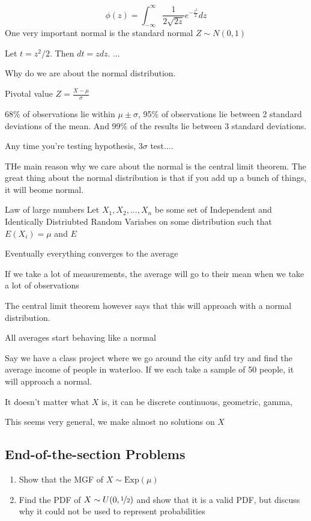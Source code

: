 \[
    \phi(z)=\int_{-\infty}^\infty \frac 1 {2\sqrt{2z}} e^{-\frac {z^2} 2}dz
\]
One very important normal is the standard normal $Z\sim N(0,1)$

Let $t=z^2/2$. Then $dt=zdz$. ...

Why do we are about the normal  distribution.

Pivotal value $Z=\frac{X-\mu}\sigma$

68\% of observations lie within $\mu\pm \sigma$, 95\% of observations lie between 2 standard deviations of the mean. And 99\% of the results lie between 3 standard deviations.

Any time you're testing hypothesis, $3\sigma$ test....


THe main reason why we care about the normal is the central limit theorem. The great thing about the normal distribution is that if you add up a bunch of things, it will beome normal. 

Law of large numbers
Let $X_1,X_2,...,X_n$ be some set of Independent and Identically Distriubted Random Variabes on some distribution such that $E(X_i)=\mu$ and $E$

Eventually everything converges to the average

If we take a lot of measurements, the average will go to their mean when we take a lot of observations

The central limit theorem however says that this will approach with a normal distribution.

All averages start behaving like a normal

Say we have a class project where we go around the city anfd try and find the average income of people in waterloo. If we each take a sample of 50 people, it will approach a normal.

It doesn't matter what $X$ is, it can be discrete continuous, geometric, gamma, 

This seems very general, we make almost no solutions on $X$







\subsection{End-of-the-section Problems}
\begin{enumerate}
    \item Show that the MGF of $X\sim \text{Exp}(\mu)$ \todo
    \item Find the PDF of $X\sim U(0,\nicefrac 1 2)$ and show that it is a valid PDF, but discuss why it could not be used to represent probabilities
\end{enumerate}
